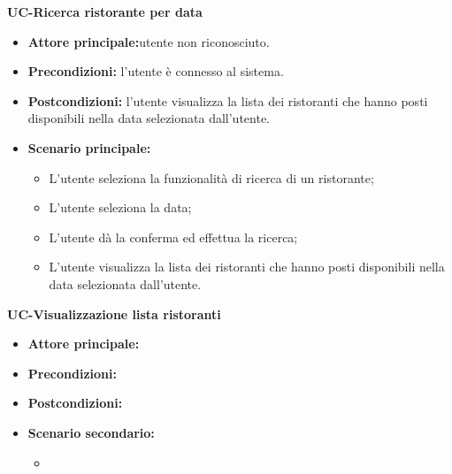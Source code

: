 \textbf{UC-Ricerca ristorante per data}
\begin{itemize}
\item \textbf{Attore principale:}utente non riconosciuto.
\item \textbf{Precondizioni:} l'utente è connesso al sistema.
\item \textbf{Postcondizioni:} l'utente visualizza la lista dei ristoranti che hanno posti disponibili
nella data selezionata dall'utente.
\item \textbf{Scenario principale:}
\begin{itemize}
    \item L'utente seleziona la funzionalità di ricerca di un ristorante;
    \item L'utente seleziona la data;
    \item L'utente dà la conferma ed effettua la ricerca;
    \item L'utente visualizza la lista dei ristoranti che hanno posti disponibili
    nella data selezionata dall'utente.
\end{itemize}
\end{itemize}

\textbf{UC-Visualizzazione lista ristoranti}
\begin{itemize}
\item \textbf{Attore principale:}
\item \textbf{Precondizioni:} 
\item \textbf{Postcondizioni:} 
\item \textbf{Scenario secondario:}
\begin{itemize}
    \item 
\end{itemize}
\end{itemize}

